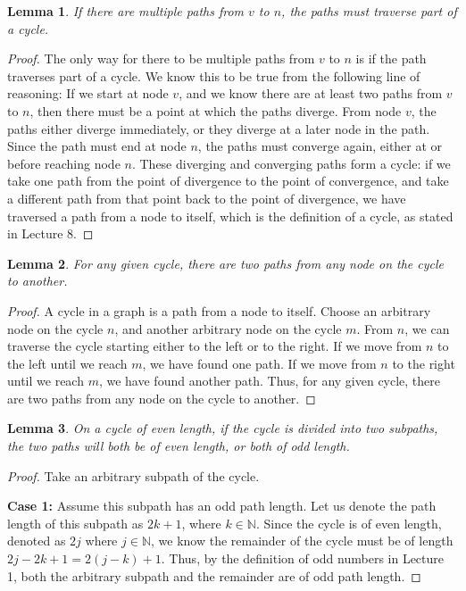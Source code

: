 \documentclass[10pt,letter]{article}
\newtheorem{lem}{Lemma}
\begin{document}
\begin{enumerate}
\begin{lem} If there are multiple paths from $v$ to $n$, the paths must traverse part of a cycle.\end{lem}
\begin{proof}
The only way for there to be multiple paths from $v$ to $n$ is if the path traverses part of a cycle. We know this to be true from the following line of reasoning: If we start at node $v$, and we know there are at least two paths from $v$ to $n$, then there must be a point at which the paths diverge. From node $v$, the paths either diverge immediately, or they diverge at a later node in the path. Since the path must end at node $n$, the paths must converge again, either at or before reaching node $n$. These diverging and converging paths form a cycle: if we take one path from the point of divergence to the point of convergence, and take a different path from that point back to the point of divergence, we have traversed a path from a node to itself, which is the definition of a cycle, as stated in Lecture 8. 
\end{proof}

\begin{lem} For any given cycle, there are two paths from any node on the cycle to another.\end{lem}
\begin{proof}
A cycle in a graph is a path from a node to itself. Choose an arbitrary node on the cycle $n$, and another arbitrary node on the cycle $m$. From $n$, we can traverse the cycle starting either to the left or to the right. If we move from $n$ to the left until we reach $m$, we have found one path. If we move from $n$ to the right until we reach $m$, we have found another path. Thus, for any given cycle, there are two paths from any node on the cycle to another.
\end{proof}


\begin{lem} On a cycle of even length, if the cycle is divided into two subpaths, the two paths will both be of even length, or both of odd length.
\end{lem}
\begin{proof} Take an arbitrary subpath of the cycle.

\textbf{Case 1:} Assume this subpath has an odd path length. Let us denote the path length of this subpath as $2k+1$, where $k \in \mathbb{N}$. Since the cycle is of even length, denoted as $2j$ where $j \in \mathbb{N}$, we know the remainder of the cycle must be of length $2j-2k+1 = 2(j-k)+1$. Thus, by the definition of odd numbers in Lecture 1, both the arbitrary subpath and the remainder are of odd path length.


\end{proof}
\end{enumerate}
\end{document}
